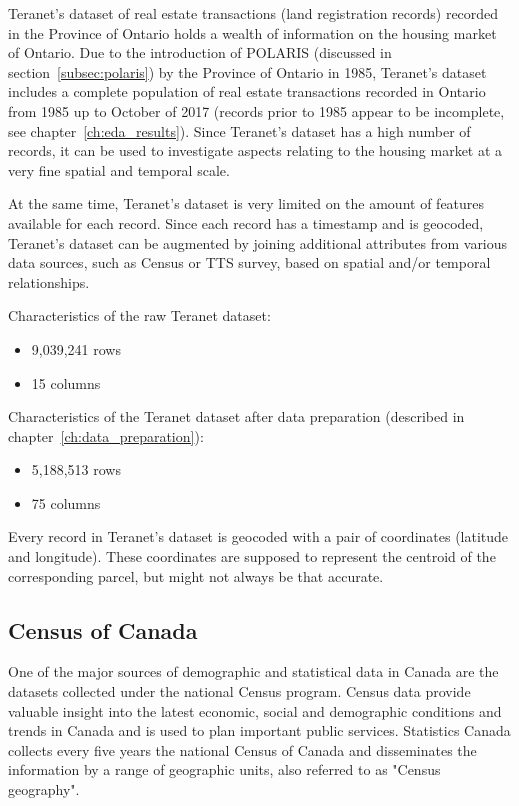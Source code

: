 Teranet's dataset\cite{TeranetEnterprisesInc.2011} of real estate transactions (land registration records) recorded in the Province of Ontario holds a wealth of information on the housing market of Ontario.
Due to the introduction of POLARIS (discussed in section~\ref{subsec:polaris}) by the Province of Ontario in 1985, Teranet's dataset includes a complete population of real estate transactions recorded in Ontario from 1985 up to October of 2017 (records prior to 1985 appear to be incomplete, see chapter~\ref{ch:eda_results}).
Since Teranet's dataset has a high number of records, it can be used to investigate aspects relating to the housing market at a very fine spatial and temporal scale.

At the same time, Teranet's dataset is very limited on the amount of features available for each record.
Since each record has a timestamp and is geocoded, Teranet's dataset can be augmented by joining additional attributes from various data sources, such as Census or TTS survey, based on spatial and/or temporal relationships.

\vspace{5mm}

Characteristics of the raw Teranet dataset:
\begin{itemize}
    \item 9,039,241 rows
    \item 15 columns
\end{itemize}

Characteristics of the Teranet dataset after data preparation (described in chapter~\ref{ch:data_preparation}):
\begin{itemize}
    \item 5,188,513 rows
    \item 75 columns
\end{itemize}

Every record in Teranet's dataset is geocoded with a pair of coordinates (latitude and longitude).
These coordinates are supposed to represent the centroid of the corresponding parcel, but might not always be that accurate.

\subsection{Census of Canada} \label{subsec:census_description}

One of the major sources of demographic and statistical data in Canada are the datasets collected under the national Census program.
Census data provide valuable insight into the latest economic, social and demographic conditions and trends in Canada and is used to plan important public services.
Statistics Canada collects every five years the national Census of Canada and disseminates the information by a range of geographic units, also referred to as "Census geography"\cite{MapandDataLibrary2019}.

